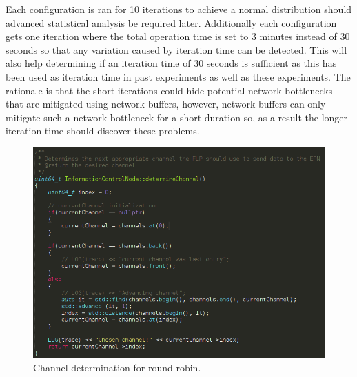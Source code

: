 \documentclass[]{article}
\begin{document}
Each configuration is ran for 10 iterations to achieve a normal distribution should advanced statistical analysis be required later. Additionally each configuration gets one iteration where the total operation time is set to 3 minutes instead of 30 seconds so that any variation caused by iteration time can be detected. This will also help determining if an iteration time of 30 seconds is sufficient as this has been used as iteration time in past experiments as well as these experiments. The rationale is that the short iterations could hide potential network bottlenecks that are mitigated using network buffers, however, network buffers can only mitigate such a network bottleneck for a short duration so, as a result the longer iteration time should discover these problems.

\begin{center}
	\begin{figure}[H]
		\includegraphics[width=\textwidth]{determine-channel}
		\caption{Channel determination for round robin.}
		\label{fig:ssh}
	\end{figure}
\end{center}
\end{document}
